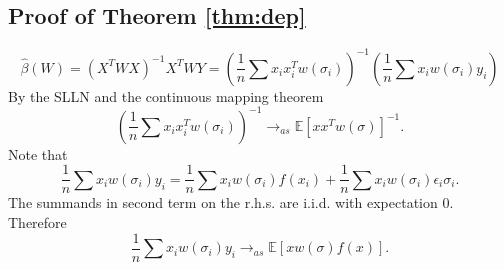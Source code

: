 \documentclass[ejs,ps,preprint]{imsart}
\numberwithin{equation}{section}
\theoremstyle{plain}
\newcommand{\E}{\mathbb{E}}
\def\E{\mathbb{E}}
\begin{document}
\subsection{Proof of Theorem \ref{thm:dep}}
\label{prf:dep}


\begin{equation*}
\widehat{\beta}(W) = (X^TWX)^{-1}X^TWY = \left(\frac{1}{n}\sum x_ix_i^Tw(\sigma_i)\right)^{-1}\left(\frac{1}{n} \sum x_iw(\sigma_i)y_i\right)
\end{equation*}
By the SLLN and the continuous mapping theorem
\begin{equation*}
\left(\frac{1}{n}\sum x_ix_i^Tw(\sigma_i)\right)^{-1} \rightarrow_{as} \E[xx^Tw(\sigma)]^{-1}.
\end{equation*}
Note that
\begin{equation*}
\frac{1}{n}\sum x_iw(\sigma_i)y_i = \frac{1}{n}\sum x_iw(\sigma_i)f(x_i) + \frac{1}{n}\sum x_iw(\sigma_i)\epsilon_i\sigma_i.
\end{equation*}
The summands in second term on the r.h.s. are i.i.d. with expectation $0$. Therefore
\begin{equation*}
\frac{1}{n}\sum x_iw(\sigma_i)y_i \rightarrow_{as} \E[xw(\sigma)f(x)].
\end{equation*}










\end{document}
